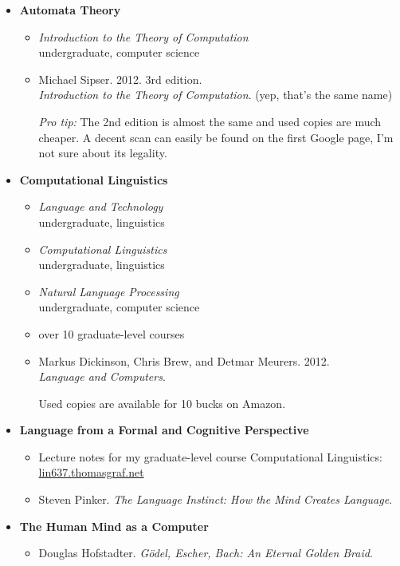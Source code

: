 \begin{itemize}
    \item \textbf{Automata Theory}
        \begin{itemize}
            \item \emph{Introduction to the Theory of Computation}\\
                undergraduate, computer science
            \item Michael Sipser. 2012. 3rd edition.\\
                \emph{Introduction to the Theory of Computation}. (yep, that's the same name)

                \smallskip
                \emph{Pro tip:} The 2nd edition is almost the same and used copies are much cheaper.
                A decent scan can easily be found on the first Google page, I'm not sure about its legality.
        \end{itemize}
    \item \textbf{Computational Linguistics}
        \begin{itemize}
            \item \emph{Language and Technology}\\
                undergraduate, linguistics
            \item \emph{Computational Linguistics}\\
                undergraduate, linguistics
            \item \emph{Natural Language Processing}\\
                undergraduate, computer science
            \item over 10 graduate-level courses
            \item Markus Dickinson, Chris Brew, and Detmar Meurers. 2012.\\
                \emph{Language and Computers}.

                \smallskip
                Used copies are available for 10 bucks on Amazon.
        \end{itemize}
    \item \textbf{Language from a Formal and Cognitive Perspective}
        \begin{itemize}
            \item Lecture notes for my graduate-level course Computational Linguistics: \href{http://lin637.thomasgraf.net}{lin637.thomasgraf.net}
            \item Steven Pinker. \emph{The Language Instinct: How the Mind Creates Language}.
        \end{itemize}
    \item \textbf{The Human Mind as a Computer}
        \begin{itemize}
            \item Douglas Hofstadter. \emph{Gödel, Escher, Bach: An Eternal Golden Braid}.
        \end{itemize}
\end{itemize}
